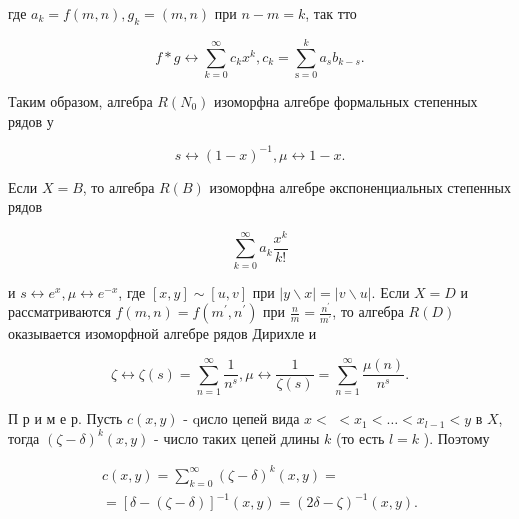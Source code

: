 \documentclass[10pt]{article}
\begin{document}
где $a_{k}=f(m, n), g_{k}=(m, n)$ при $n-m=k$, так тто



\[

f * g \leftrightarrow \sum_{k=0}^{\infty} c_{k} x^{k}, c_{k}=\sum_{\mathrm{s}=0}^{k} a_{s} b_{k-s} .

\]



Таким образом, алгебра $R\left(N_{0}\right)$ изоморфна алгебре формальных степенных рядов у



\[

s \leftrightarrow(1-x)^{-1}, \mu \leftrightarrow 1-x .

\]



Если $X=B$, то алгебра $R(B)$ изоморфна алгебре әкспоненциальных степенных рядов



\[

\sum_{k=0}^{\infty} a_{k} \frac{x^{k}}{k !}

\]



и $s \leftrightarrow e^{x}, \mu \leftrightarrow e^{-x}$, где $[x, y] \sim[u, v]$ при $|y \backslash x|=|v \backslash u|$. Если $X=D$ и рассматриваются $f(m, n)=f\left(m^{\prime}, n^{\prime}\right)$ при $\frac{n}{m}=\frac{n^{\prime}}{m^{\prime}}$, то алгебра $R(D)$ оказывается изоморфной алгебре рядов Дирихле и



\[

\zeta \leftrightarrow \zeta(s)=\sum_{n=1}^{\infty} \frac{1}{n^{s}}, \mu \leftrightarrow \frac{1}{\zeta(s)}=\sum_{n=1}^{\infty} \frac{\mu(n)}{n^{s}} .

\]



П р и м е р. Пусть $c(x, y)$ - qисло цепей вида $x<$ $<x_{1}<\ldots<x_{l-1}<y$ в $X$, тогда $(\zeta-\delta)^{k}(x, y)$ - число таких цепей длины $k$ (то есть $l=k$ ). Поэтому



\[

\begin{gathered}

c(x, y)=\sum_{k=0}^{\infty}(\zeta-\delta)^{k}(x, y)= \\

=[\delta-(\zeta-\delta)]^{-1}(x, y)=(2 \delta-\zeta)^{-1}(x, y) .

\end{gathered}

\]
\end{document}
